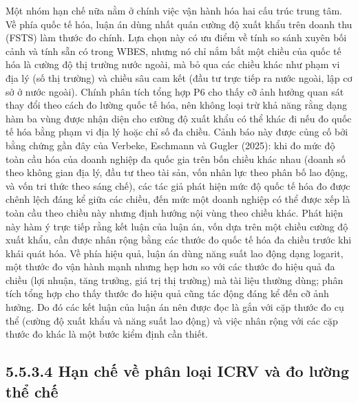 \documentclass[
  a4paper,
  13pt]{extreport}
\begin{document}
Một nhóm hạn chế nữa nằm ở chính việc vận hành hóa hai cấu trúc trung
tâm. Về phía quốc tế hóa, luận án dùng nhất quán cường độ xuất khẩu trên
doanh thu (FSTS) làm thước đo chính. Lựa chọn này có ưu điểm về tính so
sánh xuyên bối cảnh và tính sẵn có trong WBES, nhưng nó chỉ nắm bắt một
chiều của quốc tế hóa là cường độ thị trường nước ngoài, mà bỏ qua các
chiều khác như phạm vi địa lý (số thị trường) và chiều sâu cam kết (đầu
tư trực tiếp ra nước ngoài, lập cơ sở ở nước ngoài). Chính phân tích
tổng hợp P6 cho thấy cỡ ảnh hưởng quan sát thay đổi theo cách đo lường
quốc tế hóa, nên không loại trừ khả năng rằng dạng hàm ba vùng được nhận
diện cho cường độ xuất khẩu có thể khác đi nếu đo quốc tế hóa bằng phạm
vi địa lý hoặc chỉ số đa chiều. Cảnh báo này được củng cố bởi bằng chứng
gần đây của Verbeke, Eschmann và Gugler (2025): khi đo mức độ toàn cầu
hóa của doanh nghiệp đa quốc gia trên bốn chiều khác nhau (doanh số theo
không gian địa lý, đầu tư theo tài sản, vốn nhân lực theo phân bố lao
động, và vốn tri thức theo sáng chế), các tác giả phát hiện mức độ quốc
tế hóa đo được chênh lệch đáng kể giữa các chiều, đến mức một doanh
nghiệp có thể được xếp là toàn cầu theo chiều này nhưng định hướng nội
vùng theo chiều khác. Phát hiện này hàm ý trực tiếp rằng kết luận của
luận án, vốn dựa trên một chiều cường độ xuất khẩu, cần được nhân rộng
bằng các thước đo quốc tế hóa đa chiều trước khi khái quát hóa. Về phía
hiệu quả, luận án dùng năng suất lao động dạng logarit, một thước đo vận
hành mạnh nhưng hẹp hơn so với các thước đo hiệu quả đa chiều (lợi
nhuận, tăng trưởng, giá trị thị trường) mà tài liệu thường dùng; phân
tích tổng hợp cho thấy thước đo hiệu quả cũng tác động đáng kể đến cỡ
ảnh hưởng. Do đó các kết luận của luận án nên được đọc là gắn với cặp
thước đo cụ thể (cường độ xuất khẩu và năng suất lao động) và việc nhân
rộng với các cặp thước đo khác là một bước kiểm định cần thiết.

\hypertarget{hux1ea1n-chux1ebf-vux1ec1-phuxe2n-loux1ea1i-icrv-vuxe0-ux111o-lux1b0ux1eddng-thux1ec3-chux1ebf}{%
\subsection{5.5.3.4 Hạn chế về phân loại ICRV và đo lường thể
chế}\label{hux1ea1n-chux1ebf-vux1ec1-phuxe2n-loux1ea1i-icrv-vuxe0-ux111o-lux1b0ux1eddng-thux1ec3-chux1ebf}}
\end{document}
